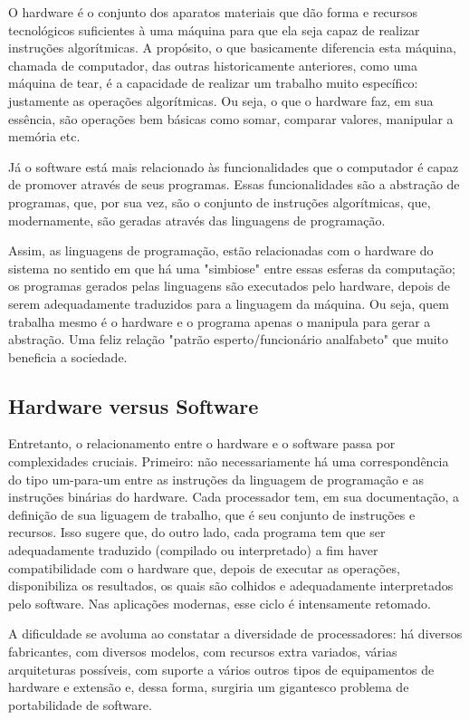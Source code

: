 \documentclass[conference]{IEEEtran}
\begin{document}
O hardware é o conjunto dos aparatos materiais que dão forma e recursos tecnológicos suficientes à uma máquina para que ela seja capaz de realizar instruções algorítmicas. A propósito, o que basicamente diferencia esta máquina, chamada de computador, das outras historicamente anteriores, como uma máquina de tear, é a capacidade de realizar um trabalho muito específico: justamente as operações algorítmicas. Ou seja, o que o hardware faz, em sua essência, são operações bem básicas como somar, comparar valores, manipular a memória etc. 

Já o software está mais relacionado às funcionalidades que o computador é capaz de promover através de seus programas. Essas funcionalidades são a abstração de programas, que, por sua vez, são o conjunto de instruções algorítmicas, que, modernamente, são geradas através das linguagens de programação.

Assim, as linguagens de programação, estão relacionadas com o hardware do sistema no sentido em que há uma "simbiose" entre essas esferas da computação; os programas gerados pelas linguagens são executados pelo hardware, depois de serem adequadamente traduzidos para a linguagem da máquina. Ou seja, quem trabalha mesmo é o hardware e o programa apenas o manipula para gerar a abstração. Uma feliz relação "patrão esperto/funcionário analfabeto" que muito beneficia a sociedade.

\subsection{Hardware versus Software}

Entretanto, o relacionamento entre o hardware e o software passa por complexidades cruciais. Primeiro: não necessariamente há uma correspondência do tipo um-para-um entre as instruções da linguagem de programação e as instruções binárias do hardware. Cada processador tem, em sua documentação, a definição de sua liguagem de trabalho, que é seu conjunto de instruções e recursos. Isso sugere que, do outro lado, cada programa tem que ser adequadamente traduzido (compilado ou interpretado) a fim haver compatibilidade com o hardware que, depois de executar as operações, disponibiliza os resultados, os quais são colhidos e adequadamente interpretados pelo software. Nas aplicações modernas, esse ciclo é intensamente retomado.

A dificuldade se avoluma ao constatar a diversidade de processadores: há diversos fabricantes, com diversos modelos, com recursos extra variados, várias arquiteturas possíveis, com suporte a vários outros tipos de equipamentos de hardware e extensão e, dessa forma, surgiria um gigantesco problema de portabilidade de software.
\end{document}
